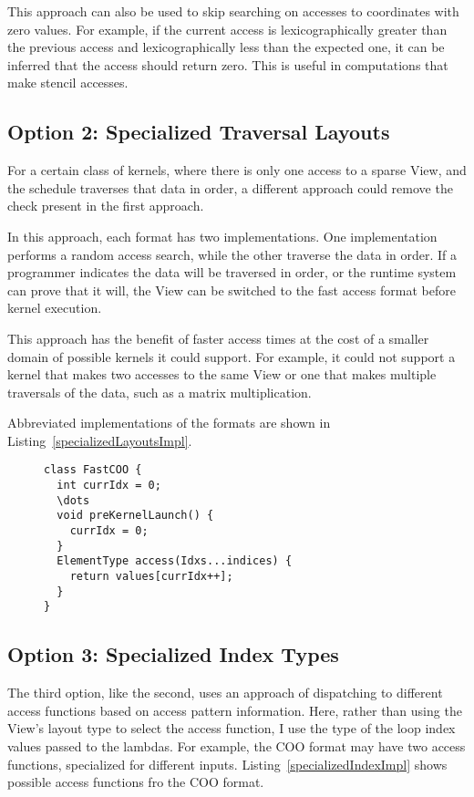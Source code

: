 This approach can also be used to skip searching on accesses to coordinates with zero values.
For example, if the current access is lexicographically greater than the previous access and lexicographically less than the expected one, it can be inferred that the access should return zero. This is useful in computations that make stencil accesses.

\subsection{Option 2: Specialized Traversal Layouts}
For a certain class of kernels, where there is only one access to a sparse View, and the schedule traverses that data in order, a different approach could remove the check present in the first approach.

In this approach, each format has two implementations. 
One implementation performs a random access search, while the other traverse the data in order. 
If a programmer indicates the data will be traversed in order, or the runtime system can prove that it will, the View can be switched to the fast access format before kernel execution.

This approach has the benefit of faster access times at the cost of a smaller domain of possible kernels it could support. 
For example, it could not support a kernel that makes two accesses to the same View or one that makes multiple traversals of the data, such as a matrix multiplication.

Abbreviated implementations of the formats are shown in Listing~\ref{specializedLayoutsImpl}.
\begin{figure}
\begin{lstlisting}[caption={Abbreviated format implementation for the Specialized Traversal Layout approach.},label=specializedLayoutsImpl]
class FastCOO {
  int currIdx = 0;
  \dots
  void preKernelLaunch() {
    currIdx = 0;
  }
  ElementType access(Idxs...indices) {
    return values[currIdx++];
  }
}
\end{lstlisting}
\end{figure}

\subsection{Option 3: Specialized Index Types}
The third option, like the second, uses an approach of dispatching to different access functions based on access pattern information.
Here, rather than using the View's layout type to select the access function, I use the type of the loop index values passed to the lambdas.
For example, the COO format may have two access functions, specialized for different inputs.
Listing~\ref{specializedIndexImpl} shows possible access functions fro the COO format.

